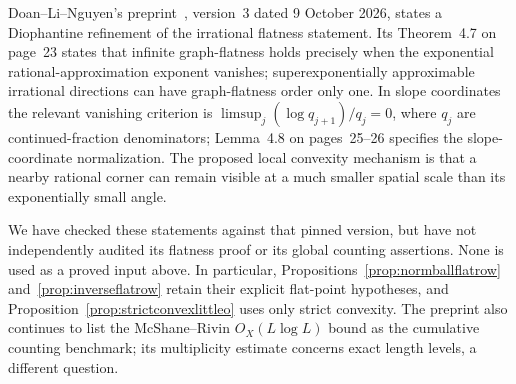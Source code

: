 Doan--Li--Nguyen's preprint~\cite{DoanLiNguyenStableNorm},
version~3 dated 9 October 2026, states a Diophantine refinement of the
irrational flatness statement. Its Theorem~4.7 on page~23 states that infinite
graph-flatness holds precisely when the exponential rational-approximation
exponent vanishes; superexponentially approximable irrational directions
can have graph-flatness order only one. In slope coordinates the relevant
vanishing criterion is $\limsup_j(\log q_{j+1})/q_j=0$, where $q_j$
are continued-fraction denominators; Lemma~4.8 on pages~25--26 specifies
the slope-coordinate normalization. The proposed local convexity
mechanism is that a nearby rational
corner can remain visible at a much smaller spatial scale than its
exponentially small angle.

We have checked these statements against that pinned version, but have
not independently audited its flatness proof or its global counting
assertions. None is used as a proved input above. In particular,
Propositions~\ref{prop:normballflatrow} and~\ref{prop:inverseflatrow}
retain their explicit flat-point hypotheses, and
Proposition~\ref{prop:strictconvexlittleo} uses only strict convexity.
The preprint also continues to list the McShane--Rivin $O_X(L\log L)$
bound as the cumulative counting benchmark; its multiplicity estimate
concerns exact length levels, a different question.


